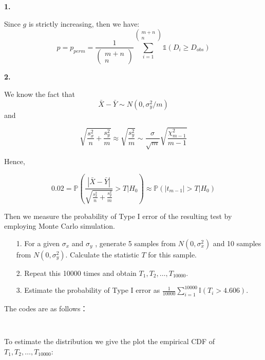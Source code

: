 \documentclass[letterpaper,11pt]{article}
\begin{document}
\begin{addmargin}[-2em]{0em} \large{\textbf{1. }}\end{addmargin}

Since $g$ is strictly increasing, then we have:
$$p = p_{perm} = \frac{1}{\begin{pmatrix}
m+n\\
n 
\end{pmatrix}}\sum_{i=1}^{\begin{pmatrix}
m+n\\
n
\end{pmatrix}}\mathbb{1}(D_i\geq D_{obs})$$

\begin{addmargin}[-2em]{0em} \large{\textbf{2. }}\end{addmargin}
 
We know the fact that  $$\bar{X} - \bar{Y} \sim N(0, \sigma_y^2/m )$$  and 
 
$$ \sqrt{\frac{s_x^2}{n} +\frac{s_y^2}{m}} \approx \sqrt{\frac{s_y^2}{m}} \sim \frac{\sigma}{\sqrt{m}} \sqrt{\frac{\chi^2_{m-1}}{m-1}} $$
 
Hence, 
 
$$0.02 = \mathbb{P} \left( \frac{|\bar{X} - \bar{Y}|}{\sqrt{\frac{s_x^2}{n} +\frac{s_y^2}{m}}} > T|H_0 \right) \approx \mathbb{P}(|t_{m-1}|>T|H_0)$$
 
Then we measure the probability of Type I error of the resulting test by employing Monte Carlo simulation.
 
\begin{enumerate}
\item[1.] For a given $\sigma_x$ and $\sigma_y$ , generate 5 samples from $N(0, \sigma^2_x)$ and 10 samples from $N(0, \sigma^2_y)$. Calculate the statistic $T$ for this sample.
 
\item[2.] Repeat this 10000 times and obtain $T_1, T_2, \ldots , T_{10000}$.
 
\item[3.] Estimate the probability of Type I error as $\frac{1}{10000} \sum^{10000}_{i=1} \mathbb{I}(T_i > 4.606)$.
\end{enumerate}
The codes are as follows：

\begin{lstlisting}
	
\end{lstlisting}

 
To estimate the distribution we give the plot the empirical CDF of $T_1, T_2, \ldots , T_{10000}$:
\end{document}

